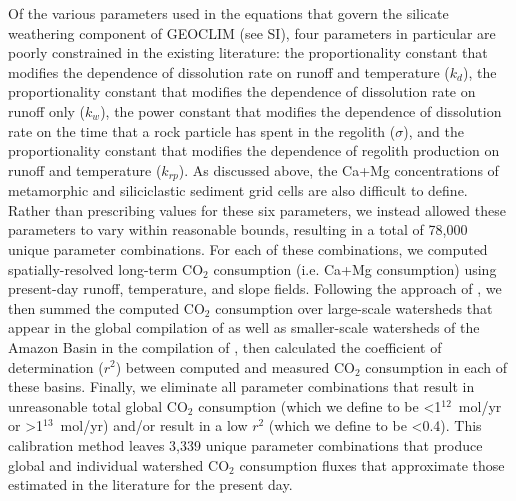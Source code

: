 \documentclass[11pt,letterpaper]{article}
\newcommand{\COtwo}{CO$_{2}$\xspace}
\begin{document}
Of the various parameters used in the equations that govern the silicate weathering component of GEOCLIM (see SI), four parameters in particular are poorly constrained in the existing literature: the proportionality constant that modifies the dependence of dissolution rate on runoff and temperature ($k_{d}$), the proportionality constant that modifies the dependence of dissolution rate on runoff only ($k_{w}$), the power constant that modifies the dependence of dissolution rate on the time that a rock particle has spent in the regolith ($\sigma$), and the proportionality constant that modifies the dependence of regolith production on runoff and temperature ($k_{rp}$). As discussed above, the Ca+Mg concentrations of metamorphic and siliciclastic sediment grid cells are also difficult to define. Rather than prescribing values for these six parameters, we instead allowed these parameters to vary within reasonable bounds, resulting in a total of 78,000 unique parameter combinations. For each of these combinations, we computed spatially-resolved long-term \COtwo consumption (i.e. Ca+Mg consumption) using present-day runoff, temperature, and slope fields. Following the approach of \citet{Maffre2018a}, we then summed the computed \COtwo consumption over large-scale watersheds that appear in the global compilation of \citet{Gaillardet1999a} as well as smaller-scale watersheds of the Amazon Basin in the compilation of \citet{Moquet2011a, Moquet2016a, Moquet2018a}, then calculated the coefficient of determination ($r^{2}$) between computed and measured \COtwo consumption in each of these basins. Finally, we eliminate all parameter combinations that result in unreasonable total global \COtwo consumption (which we define to be \textless1$^{12}$~mol/yr or \textgreater1$^{13}$~mol/yr) and/or result in a low $r^{2}$ (which we define to be \textless0.4). This calibration method leaves 3,339 unique parameter combinations that produce global and individual watershed \COtwo consumption fluxes that approximate those estimated in the literature for the present day.
\end{document}
